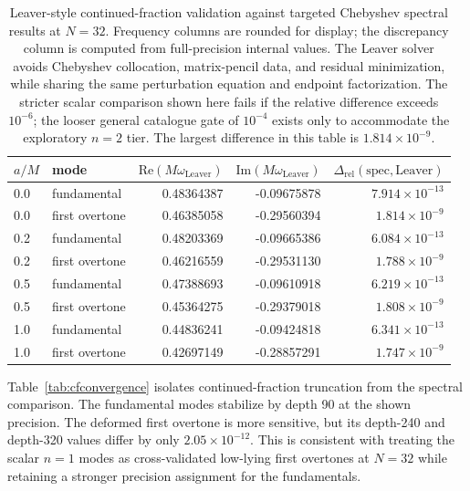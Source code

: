 \documentclass[12pt,a4paper]{article}
\begin{document}
\begin{table}[H]
\centering
\footnotesize
\renewcommand{\arraystretch}{1.14}
\begin{tabular}{llrrr}
\toprule
\(a/M\) & mode &
\(\mathrm{Re}(M\omega_{\mathrm{Leaver}})\) &
\(\mathrm{Im}(M\omega_{\mathrm{Leaver}})\) &
\(\Delta_{\mathrm{rel}}(\mathrm{spec},\mathrm{Leaver})\)\\
\midrule
0.0 & fundamental & 0.48364387 & -0.09675878 & \(7.914\times10^{-13}\)\\
0.0 & first overtone & 0.46385058 & -0.29560394 & \(1.814\times10^{-9}\)\\
0.2 & fundamental & 0.48203369 & -0.09665386 & \(6.084\times10^{-13}\)\\
0.2 & first overtone & 0.46216559 & -0.29531130 & \(1.788\times10^{-9}\)\\
0.5 & fundamental & 0.47388693 & -0.09610918 & \(6.219\times10^{-13}\)\\
0.5 & first overtone & 0.45364275 & -0.29379018 & \(1.808\times10^{-9}\)\\
1.0 & fundamental & 0.44836241 & -0.09424818 & \(6.341\times10^{-13}\)\\
1.0 & first overtone & 0.42697149 & -0.28857291 & \(1.747\times10^{-9}\)\\
\bottomrule
\end{tabular}
\color{blue}
\caption{Leaver-style continued-fraction validation against targeted Chebyshev spectral results at \(N=32\). Frequency columns are rounded for display; the discrepancy column is computed from full-precision internal values. The Leaver solver avoids Chebyshev collocation, matrix-pencil data, and residual minimization, while sharing the same perturbation equation and endpoint factorization. The stricter scalar comparison shown here fails if the relative difference exceeds \(10^{-6}\); the looser general catalogue gate of \(10^{-4}\) exists only to accommodate the exploratory \(n=2\) tier. The largest difference in this table is \(1.814\times10^{-9}\).}
\color{black}
\label{tab:leavercomparison}
\end{table}

\color{blue}
Table~\ref{tab:cfconvergence} isolates continued-fraction truncation from the
spectral comparison.  The fundamental modes stabilize by depth 90 at the shown
precision.  The deformed first overtone is more sensitive, but its depth-240
and depth-320 values differ by only \(2.05\times10^{-12}\).  This is consistent
with treating the scalar \(n=1\) modes as cross-validated low-lying first overtones at \(N=32\) while retaining a
stronger precision assignment for the fundamentals.
\color{black}
\end{document}
